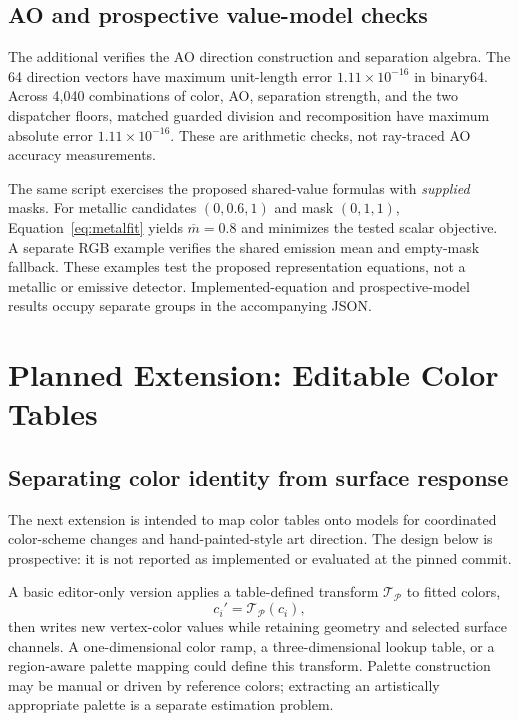 \documentclass[11pt,letterpaper]{article}
\begin{document}
\subsection{AO and prospective value-model checks}
The additional  verifies the AO direction construction and separation algebra. The 64 direction vectors have maximum unit-length error $1.11\times10^{-16}$ in binary64. Across 4,040 combinations of color, AO, separation strength, and the two dispatcher floors, matched guarded division and recomposition have maximum absolute error $1.11\times10^{-16}$. These are arithmetic checks, not ray-traced AO accuracy measurements.

The same script exercises the proposed shared-value formulas with \emph{supplied} masks. For metallic candidates $(0,0.6,1)$ and mask $(0,1,1)$, Equation~\eqref{eq:metalfit} yields $\overline m=0.8$ and minimizes the tested scalar objective. A separate RGB example verifies the shared emission mean and empty-mask fallback. These examples test the proposed representation equations, not a metallic or emissive detector. Implemented-equation and prospective-model results occupy separate groups in the accompanying JSON.

\FloatBarrier
\section{Planned Extension: Editable Color Tables}
\label{sec:palette}
\subsection{Separating color identity from surface response}
The next extension is intended to map color tables onto models for coordinated color-scheme changes and hand-painted-style art direction. The design below is prospective: it is not reported as implemented or evaluated at the pinned commit.

A basic editor-only version applies a table-defined transform $\mathcal T_{\mathcal P}$ to fitted colors,
\begin{equation}
c_i'=\mathcal T_{\mathcal P}(c_i),
\label{eq:palettesimple}
\end{equation}
then writes new vertex-color values while retaining geometry and selected surface channels. A one-dimensional color ramp, a three-dimensional lookup table, or a region-aware palette mapping could define this transform. Palette construction may be manual or driven by reference colors; extracting an artistically appropriate palette is a separate estimation problem.
\end{document}
